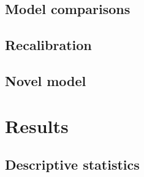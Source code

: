 \documentclass[onecolumn]{article}
\begin{document}



\subsection{Model comparisons}


\subsection{Recalibration}


\subsection{Novel model}



\section{Results}




\subsection{Descriptive statistics}

\end{document}
